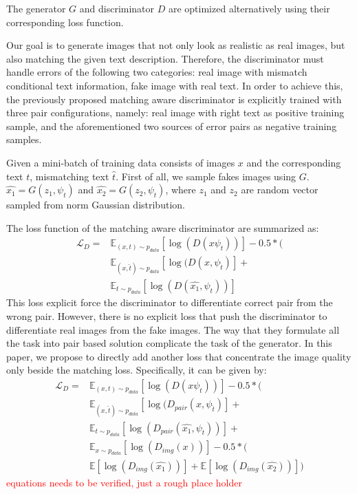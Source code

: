 \documentclass[10pt,twocolumn,letterpaper]{article}
\begin{document}
The generator $G$ and discriminator $D$ are optimized alternatively using their corresponding loss function. 

 Our goal is to generate images that not only look as realistic as real images, but also matching the given text description.
 Therefore, the discriminator must handle errors of the following two categories: real image with mismatch conditional text information, fake image with real text. In order to achieve this, the previously proposed matching aware discriminator is explicitly trained with three pair configurations, namely: real image with right text as positive training sample, and the aforementioned two sources of error pairs as negative training samples. 
 
 Given a mini-batch of training data consists of images $x$ and the corresponding text $t$, mismatching text $\hat{t}$. First of all, we sample fakes images using $G$.
 $\hat{x_1} = G(z_1, \psi_t)$ and $\hat{x_2} = G(z_2, \psi_t)$, where $z_1$ and $z_2$ are random vector sampled from norm Gaussian distribution. 
  
The loss function of the matching aware discriminator are summarized as:
  \begin{equation}
  \label{matchignloss}
  \begin{split}
  \mathcal{L}_D = 	  &\mathbb{E}_{(x, t) \sim p_{data}}[\log( D( x  \psi_t) ) ] -  0.5*(\\
					  &\mathbb{E}_{(x, \hat{t}) \sim p_{data}}[\log(D(x, \psi_{\hat{t}} )  ] +\\
					  &   \mathbb{E}_{t \sim p_{data}}[\log(D(\hat{x_1}, \psi_t) ) ] 
  \end{split}
  \end{equation}
This loss explicit force the discriminator to differentiate correct pair from the wrong pair.  However, there is no explicit loss that push the discriminator to differentiate real images from the fake images. The way that they formulate all the task into pair based solution complicate the task of the generator. In this paper, we propose to directly add another loss that concentrate the image quality only beside the matching loss. Specifically, it can be given by:
  \begin{equation}
  \label{discoss}
  \begin{split}
  \mathcal{L}_D = 	&\mathbb{E}_{(x, t) \sim p_{data}}[\log( D( x  \psi_t) ) ] -  0.5*(\\
		  &\mathbb{E}_{(x, \hat{t}) \sim p_{data}}[\log(D_{pair}(x, \psi_{\hat{t}} )  ] +\\
		  &\mathbb{E}_{t \sim p_{data}}[\log(D_{pair}(\hat{x_1}, \psi_t) ) ] + \\
		  &\mathbb{E}_{x \sim p_{data}}[\log( D_{img}(x) )] - 0.5* ( \\
		  &\mathbb{E}[\log( D_{img}(\hat{x_1}))] + \mathbb{E}[\log( D_{img}(\hat{x_2}) )  ] )
  \end{split}
  \end{equation}
\textcolor{red}{equations needs to be verified, just a rough place holder}
\end{document}
